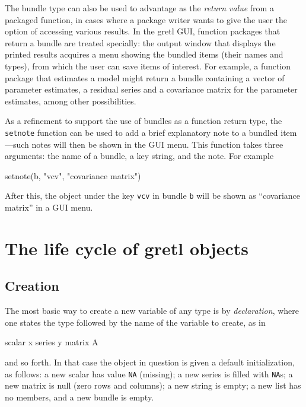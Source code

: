 The bundle type can also be used to advantage as the \textit{return
  value} from a packaged function, in cases where a package writer
wants to give the user the option of accessing various results. In the
gretl GUI, function packages that return a bundle are treated
specially: the output window that displays the printed results
acquires a menu showing the bundled items (their names and types),
from which the user can save items of interest. For example, a
function package that estimates a model might return a bundle 
containing a vector of parameter estimates, a residual series and a
covariance matrix for the parameter estimates, among other
possibilities.

As a refinement to support the use of bundles as a function return
type, the \texttt{setnote} function can be used to add a brief
explanatory note to a bundled item---such notes will then be shown in
the GUI menu.  This function takes three arguments: the name of a
bundle, a key string, and the note. For example

\begin{code}
setnote(b, "vcv", "covariance matrix")
\end{code}

After this, the object under the key \texttt{vcv} in bundle \texttt{b}
will be shown as ``covariance matrix'' in a GUI menu.

\section{The life cycle of gretl objects}

\subsection{Creation}

The most basic way to create a new variable of any type is by
\textit{declaration}, where one states the type followed by the name
of the variable to create, as in

\begin{code}
scalar x
series y
matrix A
\end{code}

and so forth. In that case the object in question is given a default
initialization, as follows: a new scalar has value \texttt{NA}
(missing); a new series is filled with \texttt{NA}s; a new matrix is
null (zero rows and columns); a new string is empty; a new list has no
members, and a new bundle is empty.

